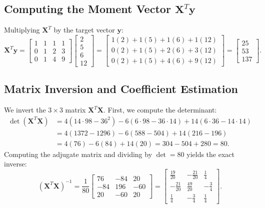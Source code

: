 \documentclass[11pt,a4paper]{article}
\numberwithin{equation}{section}
\newcommand{\X}{\mathbf{X}}
\newcommand{\y}{\mathbf{y}}
\begin{document}
\subsection{Computing the Moment Vector \texorpdfstring{$\X^T\y$}{X\textasciicircum T y}}
Multiplying $\X^T$ by the target vector $\y$:
\begin{equation}
  \X^T\y = \begin{bmatrix}
    1 & 1 & 1 & 1 \\
    0 & 1 & 2 & 3 \\
    0 & 1 & 4 & 9
  \end{bmatrix}
  \begin{bmatrix}
    2 \\ 5 \\ 6 \\ 12
  \end{bmatrix}
  = \begin{bmatrix}
    1(2) + 1(5) + 1(6) + 1(12) \\
    0(2) + 1(5) + 2(6) + 3(12) \\
    0(2) + 1(5) + 4(6) + 9(12)
  \end{bmatrix}
  = \boxed{\begin{bmatrix}
    25 \\ 53 \\ 137
  \end{bmatrix}.}
\end{equation}

\subsection{Matrix Inversion and Coefficient Estimation}
We invert the $3 \times 3$ matrix $\X^T\X$. First, we compute the determinant:
\begin{align}
  \det(\X^T\X) &= 4 \left( 14 \cdot 98 - 36^2 \right) - 6 \left( 6 \cdot 98 - 36 \cdot 14 \right) + 14 \left( 6 \cdot 36 - 14 \cdot 14 \right) \nonumber \\
               &= 4(1372 - 1296) - 6(588 - 504) + 14(216 - 196) \nonumber \\
               &= 4(76) - 6(84) + 14(20) = 304 - 504 + 280 = 80.
\end{align}
Computing the adjugate matrix and dividing by $\det = 80$ yields the exact inverse:
\begin{equation}
  (\X^T\X)^{-1} = \frac{1}{80} \begin{bmatrix}
    76 & -84 & 20 \\
    -84 & 196 & -60 \\
    20 & -60 & 20
  \end{bmatrix}
  = \begin{bmatrix}
    \frac{19}{20} & -\frac{21}{20} & \frac{1}{4} \\[4pt]
    -\frac{21}{20} & \frac{49}{20} & -\frac{3}{4} \\[4pt]
    \frac{1}{4} & -\frac{3}{4} & \frac{1}{4}
  \end{bmatrix}.
\end{equation}
\end{document}
